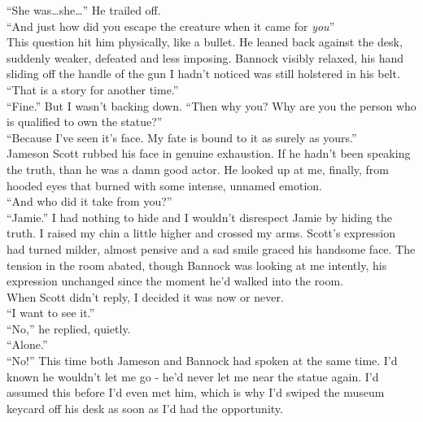 \documentclass[a5paper]{scrartcl}
\begin{document}
\enquote{She was\dots she\dots } He trailed off.\\


\enquote{And just how did you escape the creature when it came for \textit{you}}\\


This question hit him physically,  like a bullet. He leaned back against the desk,  suddenly weaker, defeated and less imposing. Bannock visibly relaxed, his hand sliding off the handle of the gun I hadn't noticed was still holstered in his belt.\\


\enquote{That is a story for another time.}\\


\enquote{Fine.} But I wasn't backing down.  \enquote{Then why you? Why are you the person who is qualified to own the statue?}\\


\enquote{Because I've seen it's face. My fate is bound to it as surely as yours.}\\


Jameson Scott rubbed his face in genuine exhaustion. If he hadn't been speaking the truth, than he was a damn good actor. He looked up at me, finally, from hooded eyes that burned with some intense, unnamed emotion.\\


\enquote{And who did it take from you?}\\


\enquote{Jamie.} I had nothing to hide and I wouldn't disrespect Jamie by hiding the truth. I raised my chin a little higher and crossed my arms. Scott's expression had turned milder, almost pensive and a sad smile graced his handsome face. The tension in the room abated, though Bannock was looking at me intently, his expression unchanged since the moment he'd walked into the room. \\


When Scott didn't reply, I decided it was now or never.\\


\enquote{I want to see it.}\\


\enquote{No,} he replied, quietly.\\


\enquote{Alone.}\\


\enquote{No!} This time both Jameson and Bannock had spoken at the same time. I'd known he wouldn't let me go - he'd never let me near the statue again. I'd assumed this before I'd even met him, which is why I'd swiped the museum keycard off his desk as soon as I'd had the opportunity.\\
\end{document}
